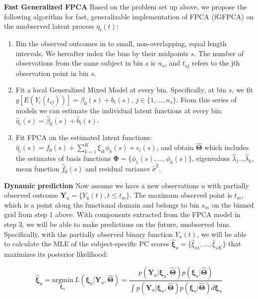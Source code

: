 \documentclass[
  11pt,
]{article}
\begin{document}
\textbf{Fast Generalized FPCA} Based on the problem set up above, we
propose the following algorithm for fast, generalizable implementation
of FPCA (fGFPCA) on the unobserved latent process \(\eta_i(t)\):

\begin{enumerate}
\def\labelenumi{\arabic{enumi}.}
\item
  Bin the observed outcomes in to small, non-overlapping, equal length
  intervals. We hereafter index the bins by their midpoints \(s\). The
  number of observations from the same subject in bin \(s\) is \(n_s\),
  and \(t_{sj}\) refers to the jth observation point in bin \(s\).
\item
  Fit a local Generalized Mixed Model at every bin. Specifically, at bin
  \(s\), we fit \(g[E(Y_i(t_{sj}))] = \beta_0(s)+b_i(s)\),
  \(j\in\{1, ..., n_s\}\). From this series of models we can estimate
  the individual latent functions at every bin:
  \(\hat{\eta}_i(s) = \hat{\beta}_0(s)+\hat{b}_i(s)\).
\item
  Fit FPCA on the estimated latent functions:
  \(\hat{\eta}_i(s) = f_0(s)+\sum_{k=1}^K\xi_{ik}\phi_{k}(s)+\epsilon_i(s)\),
  and obtain \(\hat{\boldsymbol{\Theta}}\) which includes the estimates
  of basis functions
  \(\boldsymbol{\Phi} = \{\phi_1(s), ...,\phi_k(s)\}\), eigenvalues
  \(\hat{\lambda}_1...\hat{\lambda}_k\), mean function \(\hat{f}_0(s)\)
  and residual variance \(\hat{\sigma}^2\).
\end{enumerate}

\textbf{Dynamic prediction} Now assume we have a new observations \(u\)
with partially observed outcome
\(\boldsymbol{Y}_u = \{Y_u(t), t\leq t_m\}\). The maximum observed point
is \(t_m\), which is a point along the functional domain and belongs to
bin \(s_m\) on the binned grid from step 1 above. With components
extracted from the FPCA model in step 3, we will be able to make
predictions on the future, unobserved bins. Specifically, with the
partially observed binary function \(Y_u(t)\), we will be able to
calculate the MLE of the subject-specific PC scores
\(\hat{\boldsymbol{\xi}}_u= \{\hat{\xi}_{u1},...,\hat{\xi}_{uK}\}\) that
maximizes its posterior likelihood:

\[\hat{\boldsymbol{\xi}}_u = \underset{\boldsymbol{\xi}_u}{\mathrm{argmin}} \ L(\boldsymbol{\xi}_u|\boldsymbol{Y}_u, 
\hat{\boldsymbol{\Theta}})= \frac{p(\boldsymbol{Y}_u|\boldsymbol{\xi}_u, \hat{\boldsymbol{\Theta}})p(\boldsymbol{\xi}_u|\hat{\boldsymbol{\Theta}})}{\int p(\boldsymbol{Y}_u|\boldsymbol{\xi}_u,\hat{\boldsymbol{\Theta}})p(\boldsymbol{\xi}_u|\hat{\boldsymbol{\Theta}})d\boldsymbol{\xi}_u}\]
\end{document}
